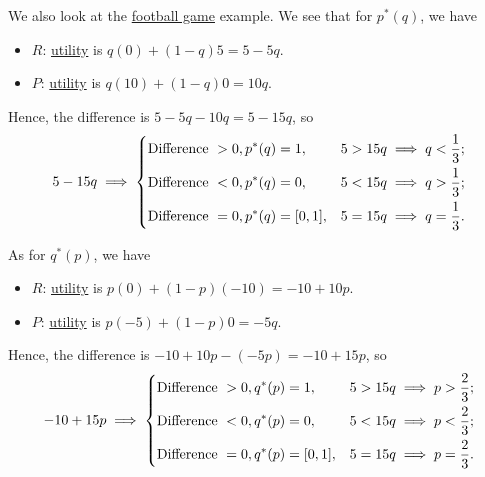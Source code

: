 \begin{eg}
	We also look at the \hyperref[eg:football]{football game} example. We see that for \(p^{\ast}(q)\), we have
	\begin{itemize}
		\item \(R\): \hyperref[def:reward]{utility} is \(q(0)+(1 - q)5 = 5 - 5q\).
		\item \(P\): \hyperref[def:reward]{utility} is \(q(10)+(1 - q)0 = 10q\).
	\end{itemize}
	Hence, the difference is \(5 - 5q-10q  = 5 - 15q\), so
	\[
		5 - 15q \implies \begin{dcases}
			\text{Difference }> 0, p^{\ast}(q) = 1,     & 5>15q \implies q<\frac{1}{3}; \\
			\text{Difference }< 0, p^{\ast}(q) = 0,     & 5<15q \implies q>\frac{1}{3}; \\
			\text{Difference }= 0, p^{\ast}(q) = [0,1], & 5=15q \implies q=\frac{1}{3}.
		\end{dcases}
	\]

	As for \(q^{\ast}(p)\), we have
	\begin{itemize}
		\item \(R\): \hyperref[def:reward]{utility} is \(p(0)+(1 - p)(-10)= -10 + 10p\).
		\item \(P\): \hyperref[def:reward]{utility} is \(p(-5)+(1 - p)0 = -5q\).
	\end{itemize}
	Hence, the difference is \(-10 + 10p - (-5p) = -10 + 15p\), so
	\[
		-10 +15p\implies \begin{dcases}
			\text{Difference }> 0, q^{\ast}(p) = 1,     & 5>15q \implies p>\frac{2}{3}; \\
			\text{Difference }< 0, q^{\ast}(p) = 0,     & 5<15q \implies p<\frac{2}{3}; \\
			\text{Difference }= 0, q^{\ast}(p) = [0,1], & 5=15q \implies p=\frac{2}{3}.
		\end{dcases}
	\]
	\begin{center}
	\end{center}
\end{eg}

